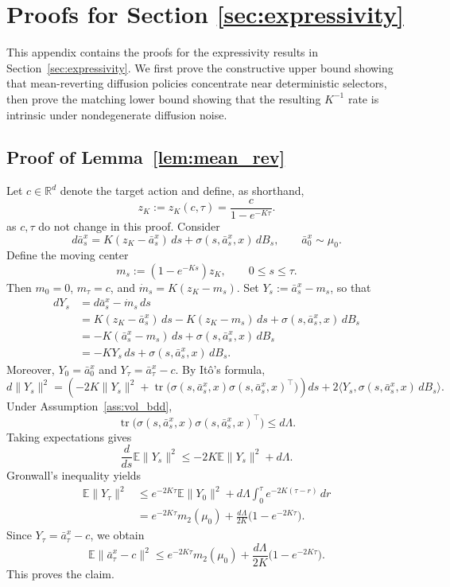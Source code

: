 \documentclass{article}
\newcommand{\1}{\mathbbm{1}}
\numberwithin{equation}{section}
\begin{document}
\section{Proofs for Section \ref{sec:expressivity}}
This appendix contains the proofs for the expressivity results in Section~\ref{sec:expressivity}. We first prove the constructive upper bound showing that mean-reverting diffusion policies concentrate near deterministic selectors, then prove the matching lower bound showing that the resulting \(K^{-1}\) rate is intrinsic under nondegenerate diffusion noise.
\label{app:expressivity}
\subsection{Proof of Lemma~\ref{lem:mean_rev}}
\label{sec:proof_mean_rev}

Let \(c\in\mathbb R^d\) denote the target action and define, as shorthand,
\[
    z_K:=z_{K}(c,\tau)=\frac{c}{1-e^{-K\tau}}.
\]
as $c, \tau$ do not change in this proof. Consider
\[
    d\bar a^x_s
    =
    K(z_K-\bar a^x_s)\,ds
    +
    \sigma(s,\bar a^x_s,x)\,dB_s,
    \qquad
    \bar a^x_0\sim \mu_0 .
\]
Define the moving center
\[
    m_s:=(1-e^{-Ks})z_K,\qquad 0\le s\le \tau .
\]
Then \(m_0=0\), \(m_\tau=c\), and
$
    \dot m_s=K(z_K-m_s).
$ Set
$
    Y_s:=\bar a^x_s-m_s$, so that
\[
\begin{aligned}
    dY_s
    &=
    d\bar a^x_s-\dot m_s\,ds  \\
    &=
    K(z_K-\bar a^x_s)\,ds
    -
    K(z_K-m_s)\,ds
    +
    \sigma(s,\bar a^x_s,x)\,dB_s  \\
    &=
    -K(\bar a^x_s-m_s)\,ds
    +
    \sigma(s,\bar a^x_s,x)\,dB_s  \\
    &=
    -K Y_s\,ds
    +
    \sigma(s,\bar a^x_s,x)\,dB_s .
\end{aligned}
\]
Moreover, \(Y_0=\bar a^x_0\) and \(Y_\tau=\bar a^x_\tau-c\). By It\^o's formula,
\[
    d\|Y_s\|^2
    =
    \left(
        -2K\|Y_s\|^2
        +
        \operatorname{tr}\bigl(
            \sigma(s,\bar a^x_s,x)\sigma(s,\bar a^x_s,x)^\top
        \bigr)
    \right)ds
    +
    2\langle Y_s,\sigma(s,\bar a^x_s,x)\,dB_s\rangle .
\]
Under Assumption~\ref{ass:vol_bdd},
\[
    \operatorname{tr}\bigl(
        \sigma(s,\bar a^x_s,x)\sigma(s,\bar a^x_s,x)^\top
    \bigr)
    \le d\Lambda .
\]
Taking expectations gives
\[
    \frac{d}{ds}\mathbb E\|Y_s\|^2
    \le
    -2K\mathbb E\|Y_s\|^2+d\Lambda .
\]
Gronwall's inequality yields
\[
\begin{aligned}
    \mathbb E\|Y_\tau\|^2
    &\le
    e^{-2K\tau}\mathbb E\|Y_0\|^2
    +
    d\Lambda\int_0^\tau e^{-2K(\tau-r)}\,dr  \\
    &=
    e^{-2K\tau}m_2(\mu_0)
    +
    \frac{d\Lambda}{2K}
    \bigl(1-e^{-2K\tau}\bigr).
\end{aligned}
\]
Since \(Y_\tau=\bar a^x_\tau-c\), we obtain
\[
    \mathbb E\|\bar a^x_\tau-c\|^2
    \le
    e^{-2K\tau}m_2(\mu_0)
    +
    \frac{d\Lambda}{2K}
    \bigl(1-e^{-2K\tau}\bigr).
\]
This proves the claim.
\end{document}
